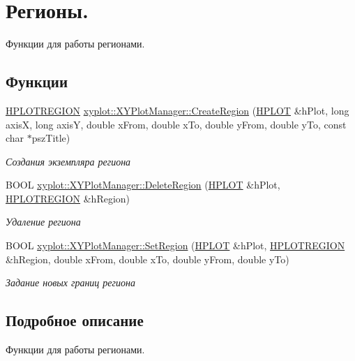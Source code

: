 \hypertarget{group__gr_rgn_ex}{\section{Регионы.}
\label{group__gr_rgn_ex}
}


Функции для работы регионами.  


\subsection*{Функции}
\begin{DoxyCompactItemize}
\item 
\hyperlink{classxyplot_1_1_h_p_l_o_t_r_e_g_i_o_n}{H\-P\-L\-O\-T\-R\-E\-G\-I\-O\-N} \hyperlink{group__gr_rgn_ex_ga7505d9ffcaedba6a7b8861b537e3eb23}{xyplot\-::\-X\-Y\-Plot\-Manager\-::\-Create\-Region} (\hyperlink{classxyplot_1_1_h_p_l_o_t}{H\-P\-L\-O\-T} \&h\-Plot, long axis\-X, long axis\-Y, double x\-From, double x\-To, double y\-From, double y\-To, const char $\ast$psz\-Title)
\begin{DoxyCompactList}\small\item\em Создания экземпляра региона \end{DoxyCompactList}\item 
B\-O\-O\-L \hyperlink{group__gr_rgn_ex_ga752b100470bc7e465f283a957c67a24d}{xyplot\-::\-X\-Y\-Plot\-Manager\-::\-Delete\-Region} (\hyperlink{classxyplot_1_1_h_p_l_o_t}{H\-P\-L\-O\-T} \&h\-Plot, \hyperlink{classxyplot_1_1_h_p_l_o_t_r_e_g_i_o_n}{H\-P\-L\-O\-T\-R\-E\-G\-I\-O\-N} \&h\-Region)
\begin{DoxyCompactList}\small\item\em Удаление региона \end{DoxyCompactList}\item 
B\-O\-O\-L \hyperlink{group__gr_rgn_ex_ga8e9c9b0cf069c241d4b3349ef7eec32b}{xyplot\-::\-X\-Y\-Plot\-Manager\-::\-Set\-Region} (\hyperlink{classxyplot_1_1_h_p_l_o_t}{H\-P\-L\-O\-T} \&h\-Plot, \hyperlink{classxyplot_1_1_h_p_l_o_t_r_e_g_i_o_n}{H\-P\-L\-O\-T\-R\-E\-G\-I\-O\-N} \&h\-Region, double x\-From, double x\-To, double y\-From, double y\-To)
\begin{DoxyCompactList}\small\item\em Задание новых границ региона \end{DoxyCompactList}\end{DoxyCompactItemize}


\subsection{Подробное описание}
Функции для работы регионами. 

